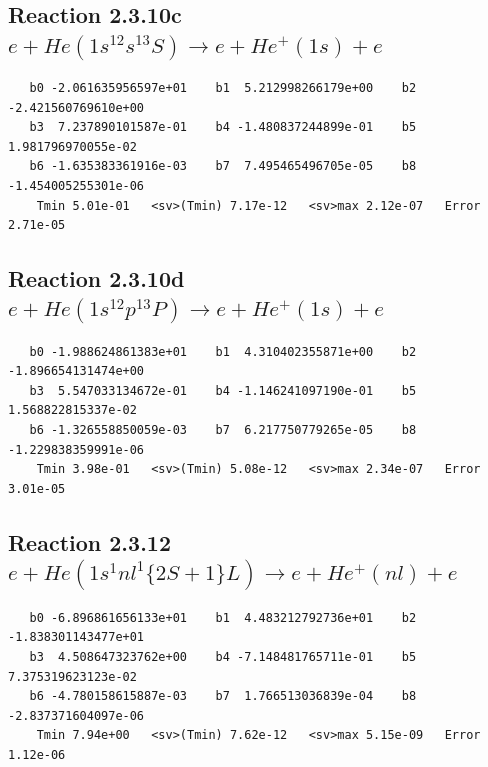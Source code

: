 \documentclass[12pt,dvipdfmx]{article}
\begin{document}
\newpage
\subsection{
Reaction 2.3.10c $  e + He(1s^12s^13S) \rightarrow e + He^+(1s) + e$}


\begin{small}\begin{verbatim}
   b0 -2.061635956597e+01    b1  5.212998266179e+00    b2 -2.421560769610e+00
   b3  7.237890101587e-01    b4 -1.480837244899e-01    b5  1.981796970055e-02
   b6 -1.635383361916e-03    b7  7.495465496705e-05    b8 -1.454005255301e-06
    Tmin 5.01e-01   <sv>(Tmin) 7.17e-12   <sv>max 2.12e-07   Error 2.71e-05
\end{verbatim}\end{small}

\newpage
\subsection{
Reaction 2.3.10d $ e + He(1s^12p^13P) \rightarrow e + He^+(1s) + e$}


\begin{small}\begin{verbatim}
   b0 -1.988624861383e+01    b1  4.310402355871e+00    b2 -1.896654131474e+00
   b3  5.547033134672e-01    b4 -1.146241097190e-01    b5  1.568822815337e-02
   b6 -1.326558850059e-03    b7  6.217750779265e-05    b8 -1.229838359991e-06
    Tmin 3.98e-01   <sv>(Tmin) 5.08e-12   <sv>max 2.34e-07   Error 3.01e-05
\end{verbatim}\end{small}







\newpage
\subsection{
Reaction 2.3.12 $  e + He(1s^1nl^1 \{2S+1\}L) \rightarrow e + He^+(nl) + e$}


\begin{small}\begin{verbatim}
   b0 -6.896861656133e+01    b1  4.483212792736e+01    b2 -1.838301143477e+01
   b3  4.508647323762e+00    b4 -7.148481765711e-01    b5  7.375319623123e-02
   b6 -4.780158615887e-03    b7  1.766513036839e-04    b8 -2.837371604097e-06
    Tmin 7.94e+00   <sv>(Tmin) 7.62e-12   <sv>max 5.15e-09   Error 1.12e-06
\end{verbatim}\end{small}
\end{document}
